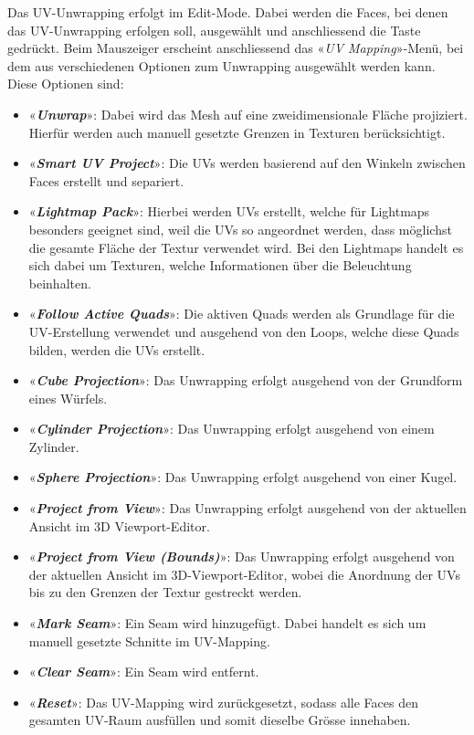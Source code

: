 \documentclass[
]{book}
\providecommand{\tightlist}{%
  \setlength{\itemsep}{0pt}\setlength{\parskip}{0pt}}\usepackage{longtable,booktabs,array}
\newcommand{\kbd}[1]{\fbox{\texttt{#1}}}
\begin{document}
Das UV-Unwrapping erfolgt im Edit-Mode. Dabei werden die Faces, bei
denen das UV-Unwrapping erfolgen soll, ausgewählt und anschliessend die
Taste \kbd{U} gedrückt. Beim Mauszeiger erscheint anschliessend das
«\emph{UV Mapping}»-Menü, bei dem aus verschiedenen Optionen zum
Unwrapping ausgewählt werden kann. Diese Optionen sind:

\begin{itemize}
\tightlist
\item
  «\textbf{\emph{Unwrap}}»: Dabei wird das Mesh auf eine
  zweidimensionale Fläche projiziert. Hierfür werden auch manuell
  gesetzte Grenzen in Texturen berücksichtigt.
\item
  «\textbf{\emph{Smart UV Project}}»: Die UVs werden basierend auf den
  Winkeln zwischen Faces erstellt und separiert.
\item
  «\textbf{\emph{Lightmap Pack}}»: Hierbei werden UVs erstellt, welche
  für Lightmaps besonders geeignet sind, weil die UVs so angeordnet
  werden, dass möglichst die gesamte Fläche der Textur verwendet wird.
  Bei den Lightmaps handelt es sich dabei um Texturen, welche
  Informationen über die Beleuchtung beinhalten.
\item
  «\textbf{\emph{Follow Active Quads}}»: Die aktiven Quads werden als
  Grundlage für die UV-Erstellung verwendet und ausgehend von den Loops,
  welche diese Quads bilden, werden die UVs erstellt.
\item
  «\textbf{\emph{Cube Projection}}»: Das Unwrapping erfolgt ausgehend
  von der Grundform eines Würfels.
\item
  «\textbf{\emph{Cylinder Projection}}»: Das Unwrapping erfolgt
  ausgehend von einem Zylinder.
\item
  «\textbf{\emph{Sphere Projection}}»: Das Unwrapping erfolgt ausgehend
  von einer Kugel.
\item
  «\textbf{\emph{Project from View}}»: Das Unwrapping erfolgt ausgehend
  von der aktuellen Ansicht im 3D Viewport-Editor.
\item
  «\textbf{\emph{Project from View (Bounds)}}»: Das Unwrapping erfolgt
  ausgehend von der aktuellen Ansicht im 3D-Viewport-Editor, wobei die
  Anordnung der UVs bis zu den Grenzen der Textur gestreckt werden.
\item
  «\textbf{\emph{Mark Seam}}»: Ein Seam wird hinzugefügt. Dabei handelt
  es sich um manuell gesetzte Schnitte im UV-Mapping.
\item
  «\textbf{\emph{Clear Seam}}»: Ein Seam wird entfernt.
\item
  «\textbf{\emph{Reset}}»: Das UV-Mapping wird zurückgesetzt, sodass
  alle Faces den gesamten UV-Raum ausfüllen und somit dieselbe Grösse
  innehaben.
\end{itemize}
\end{document}
